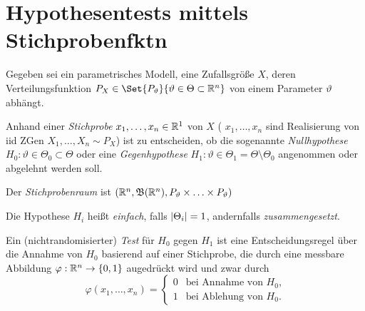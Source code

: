 \documentclass{cheat-sheet}
\newcommand{\Bor}{\mathfrak{B}} %
\begin{document}


\section{Hypothesentests mittels Stichprobenfktn}



\begin{modell}
  Gegeben sei ein parametrisches Modell, \dh eine Zufallsgröße $X$, deren Verteilungsfunktion $P_X \in \Set{P_\vartheta}{\vartheta \in \Theta \subset \R^n}$ von einem Parameter $\vartheta$ abhängt.
\end{modell}

\begin{prob}
  Anhand einer \emph{Stichprobe} $x_1, \ldots, x_n \in \mathbb{R}^1$ von $X$ (\dh{} $x_1, \ldots, x_n$ sind Realisierung von iid ZGen $X_1, \ldots, X_n \sim P_X$) ist zu entscheiden, ob die sogenannte \emph{Nullhypothese} $H_0 : \vartheta \in \Theta_0 \subset \Theta$ oder eine \emph{Gegenhypothese} $H_1 : \vartheta \in \Theta_1 = \Theta \setminus \Theta_0$ angenommen oder abgelehnt werden soll.
\end{prob}

\begin{defn}
  Der \emph{Stichprobenraum} ist $(\R^n, \Bor(\R^n), P_\vartheta \times \ldots \times P_\vartheta)$
\end{defn}

\begin{terminologie}
  Die Hypothese $H_i$ heißt \emph{einfach}, falls $\lvert\Theta_i\rvert = 1$, andernfalls \emph{zusammengesetzt}.
\end{terminologie}

\begin{defn}
  Ein (nichtrandomisierter) \emph{Test} für $H_0$ gegen $H_1$ ist eine Entscheidungsregel über die Annahme von $H_0$ basierend auf einer Stichprobe, die durch eine messbare Abbildung $\varphi : \mathbb{R}^n \to \{ 0, 1 \}$ augedrückt wird und zwar durch
  \[ \varphi(x_1, \ldots, x_n) = \begin{cases}
    0 & \text{bei Annahme von $H_0$,} \\
    1 & \text{bei Ablehung von $H_0$.}
  \end{cases} \]
\end{defn}
\end{document}
